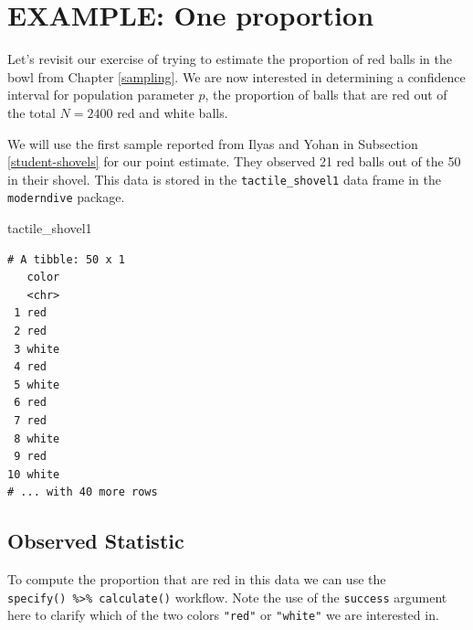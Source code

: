 \documentclass[12pt,]{krantz}
\makeatletter
\newenvironment{Shaded}{\begin{snugshade}}{\end{snugshade}}
\newcommand{\KeywordTok}[1]{\textcolor[rgb]{0.27,0.27,0.27}{\textbf{#1}}}
\newcommand{\DataTypeTok}[1]{\textcolor[rgb]{0.27,0.27,0.27}{#1}}
\newcommand{\StringTok}[1]{\textcolor[rgb]{0.5,0.5,0.5}{#1}}
\newcommand{\OtherTok}[1]{\textcolor[rgb]{0.37,0.37,0.37}{#1}}
\newcommand{\OperatorTok}[1]{\textcolor[rgb]{0.43,0.43,0.43}{\textbf{#1}}}
\newcommand{\NormalTok}[1]{#1}
\newenvironment{kframe}{%
\medskip{}
\setlength{\fboxsep}{.8em}
 \def\at@end@of@kframe{}%
 \ifinner\ifhmode%
  \def\at@end@of@kframe{\end{minipage}}%
  \begin{minipage}{\columnwidth}%
 \fi\fi%
 \def\FrameCommand##1{\hskip\@totalleftmargin \hskip-\fboxsep
 \colorbox{shadecolor}{##1}\hskip-\fboxsep
     \hskip-\linewidth \hskip-\@totalleftmargin \hskip\columnwidth}%
 \MakeFramed {\advance\hsize-\width
   \@totalleftmargin\z@ \linewidth\hsize
   \@setminipage}}%
 {\par\unskip\endMakeFramed%
 \at@end@of@kframe}
\renewenvironment{Shaded}{\begin{kframe}}{\end{kframe}}
\makeatother
\begin{document}
\section{EXAMPLE: One proportion}\label{one-prop-ci}

Let's revisit our exercise of trying to estimate the proportion of red
balls in the bowl from Chapter \ref{sampling}. We are now interested in
determining a confidence interval for population parameter \(p\), the
proportion of balls that are red out of the total \(N = 2400\) red and
white balls.

We will use the first sample reported from Ilyas and Yohan in Subsection
\ref{student-shovels} for our point estimate. They observed 21 red balls
out of the 50 in their shovel. This data is stored in the
\texttt{tactile\_shovel1} data frame in the \texttt{moderndive} package.

\begin{Shaded}
\begin{Highlighting}[]
\NormalTok{tactile_shovel1}
\end{Highlighting}
\end{Shaded}

\begin{verbatim}
# A tibble: 50 x 1
   color
   <chr>
 1 red  
 2 red  
 3 white
 4 red  
 5 white
 6 red  
 7 red  
 8 white
 9 red  
10 white
# ... with 40 more rows
\end{verbatim}

\subsection{Observed Statistic}\label{observed-statistic}

To compute the proportion that are red in this data we can use the
\texttt{specify()\ \%\textgreater{}\%\ calculate()} workflow. Note the
use of the \texttt{success} argument here to clarify which of the two
colors \texttt{"red"} or \texttt{"white"} we are interested in.

\begin{Shaded}
\end{Shaded}
\end{document}
